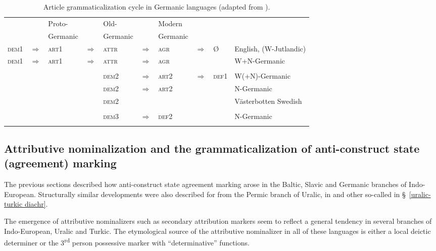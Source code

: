 {%
\begin{sidewaystable}
\begin{tabular}[t]{l l l l l l l l l l}
\lsptoprule
&	&Proto\hyp{}& &Old-&	&Modern&&\\
&	&Germanic&	&Germanic&	&Germanic&&\\
\midrule
\textsc{dem1}&$\Rightarrow$&\textsc{art1}&$\Rightarrow$&\textsc{attr}&$\Rightarrow$&\textsc{agr}&$\Rightarrow$&Ø&English, (W-Jutlandic)\\
\textsc{dem1}&$\Rightarrow$&\textsc{art1}&$\Rightarrow$&\textsc{attr}&$\Rightarrow$&\textsc{agr}&&&W+N-Germanic\\
\\
&&&		&\textsc{dem2}&$\Rightarrow$&\textsc{art2}&$\Rightarrow$&\textsc{def1}&W(+N)-Germanic\\
&&&		&\textsc{dem2}&$\Rightarrow$&\textsc{art2}&&&N-Germanic\\
&&&		&\textsc{dem2}&&&&&Västerbotten Swedish\\
\\
&&&		&\textsc{dem3}&$\Rightarrow$&\textsc{def2}&&&N-Germanic\\
\lspbottomrule
\end{tabular}
\caption[Article grammaticalization cycle in Germanic]{Article grammaticalization cycle in Germanic languages (adapted from \citealt[272]{riesler2006a}).}
\end{sidewaystable}

\subsection[Attributive nominalization and anti\hyp{}construct state]{Attributive nominalization and the grammaticalization of anti\hyp{}construct state (agreement) marking}
The previous sections described how anti\hyp{}construct state agreement marking arose in the Baltic, Slavic and Germanic branches of Indo-European. Structurally similar developments were also described for  from the Permic branch of Uralic, in  and other so-called  in \S~\ref{uralic-turkic diachr}. 

The emergence of attributive nominalizers such as secondary attribution markers seem to reflect a general tendency in several branches of Indo-European, Uralic and Turkic. The etymological source of the attributive nominalizer in all of these languages is either a local deictic determiner or the 3\textsuperscript{rd} person possessive marker with “determinative” functions.

}
